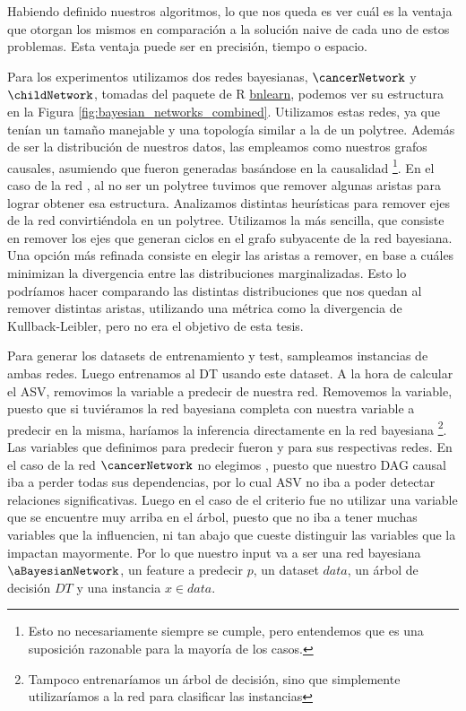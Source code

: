 Habiendo definido nuestros algoritmos, lo que nos queda es ver cuál es la ventaja que otorgan los mismos en comparación a la solución naive de cada uno de estos problemas. Esta ventaja puede ser en precisión, tiempo o espacio. 

Para los experimentos utilizamos dos redes bayesianas, $\cancerNetwork$ y $\childNetwork$, tomadas del paquete de R \href{https://www.bnlearn.com/bnrepository/}{bnlearn}, podemos ver su estructura en la Figura \ref{fig:bayesian_networks_combined}. Utilizamos estas redes, ya que tenían un tamaño manejable y una topología similar a la de un polytree. Además de ser la distribución de nuestros datos, las empleamos como nuestros grafos causales, asumiendo que fueron generadas basándose en la causalidad \footnote{Esto no necesariamente siempre se cumple, pero entendemos que es una suposición razonable para la mayoría de los casos.}.
 En el caso de la red \childNetwork, al no ser un polytree tuvimos que remover algunas aristas para lograr obtener esa estructura. Analizamos distintas heurísticas para remover ejes de la red convirtiéndola en un polytree. Utilizamos la más sencilla, que consiste en remover los ejes que generan ciclos en el grafo subyacente de la red bayesiana. Una opción más refinada consiste en elegir las aristas a remover, en base a cuáles minimizan la divergencia entre las distribuciones marginalizadas. Esto lo podríamos hacer comparando las distintas distribuciones que nos quedan al remover distintas aristas, utilizando una métrica como la divergencia de Kullback-Leibler, pero no era el objetivo de esta tesis. 

Para generar los datasets de entrenamiento y test, sampleamos instancias de ambas redes. Luego entrenamos al DT usando este dataset. A la hora de calcular el ASV, removimos la variable a predecir de nuestra red. Removemos la variable, puesto que si tuviéramos la red bayesiana completa con nuestra variable a predecir en la misma, haríamos la inferencia directamente en la red bayesiana \footnote{Tampoco entrenaríamos un árbol de decisión, sino que simplemente utilizaríamos a la red para clasificar las instancias}. Las variables que definimos para predecir fueron  y  para sus respectivas redes. En el caso de la red $\cancerNetwork$ no elegimos , puesto que nuestro DAG causal iba a perder todas sus dependencias, por lo cual ASV no iba a poder detectar relaciones significativas. Luego en el caso de \childNetwork{} el criterio fue no utilizar una variable que se encuentre muy arriba en el árbol, puesto que no iba a tener muchas variables que la influencien, ni tan abajo que cueste distinguir las variables que la impactan mayormente. Por lo que nuestro input va a ser una red bayesiana $\aBayesianNetwork$, un feature a predecir $p$, un dataset $data$, un árbol de decisión $DT$ y una instancia $x \in data$. 

